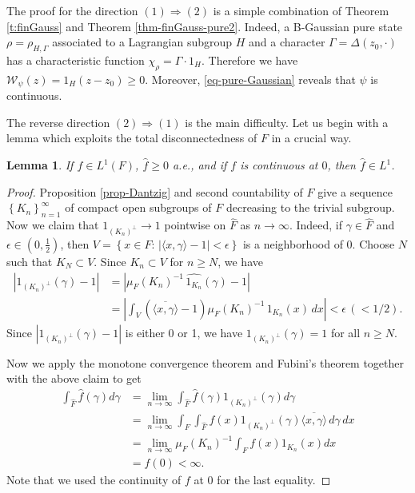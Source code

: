 \documentclass[12pt,reqno]{amsart}
\newtheorem{lem}[thm]{Lemma}
\theoremstyle{definition}
\theoremstyle{definition}
\theoremstyle{definition}
\numberwithin{thm}{section}
\numberwithin{equation}{section}
\newcommand{\set}[1]{\left\{#1\right\}}
\newcommand{\la}{\langle}
\newcommand{\ra}{\rangle}
\newcommand{\W}{\mathcal{W}}
\newcommand{\wh}[1]{\widehat{#1}}
\begin{document}
The proof for the direction $(1)\Rightarrow(2)$ is a simple combination of Theorem \ref{t:finGauss} and Theorem \ref{thm-finGauss-pure2}. Indeed, a B-Gaussian pure state $\rho=\rho_{H,\Gamma}$ associated to a Lagrangian subgroup $H$ and a character $\Gamma=\Delta(z_0,\cdot)$ has a characteristic function $\chi_{\rho}=\Gamma\cdot  1_H$. Therefore we have $\W_{\psi}(z)=1_H(z-z_0)\geq 0$. Moreover, \eqref{eq-pure-Gaussian} reveals that $\psi$ is continuous.

The reverse direction $(2)\Rightarrow(1)$ is the main difficulty. Let us begin with a lemma which exploits the total disconnectedness of $F$ in a crucial way.


\begin{lem} \label{lem-totdisconn-integrable}
If $f\in L^1(F)$, $\hat{f}\geq 0$ a.e., and if $f$ is continuous at $0$, then $\hat{f}\in L^1$.
\end{lem}
\begin{proof}
Proposition \ref{prop-Dantzig} and second countability of $F$ give a sequence $\set{K_n}_{n=1}^{\infty}$ of compact open subgroups of $F$ decreasing to the trivial subgroup. Now we claim that $1_{(K_n)^{\perp}}\to 1$ pointwise on $\wh{F}$ as $n\to \infty$. Indeed, if $\gamma\in \wh{F}$ and $\epsilon\in (0,\frac{1}{2})$, then $V=\set{x\in F:\, |\la x,\gamma\ra-1|<\epsilon}$ is a neighborhood of $0$. Choose $N$ such that $K_N\subset V$. Since $K_n\subset V$ for $n\geq N$, we have
\begin{align*}
    |1_{(K_n)^{\perp}}(\gamma)-1|&=\left|\mu_F(K_n)^{-1}\,\widehat{1_{K_n}}(\gamma)-1\right|\\
    &=\left|\int_V (\overline{\la x,\gamma\ra}-1)\mu_F(K_n)^{-1}\,1_{K_n}(x)\,dx\right|<\epsilon\,(<1/2).
\end{align*}
Since $|1_{(K_n)^{\perp}}(\gamma)-1|$ is either 0 or 1, we have $1_{(K_n)^{\perp}}(\gamma)=1$ for all $n\geq N$.

Now we apply the monotone convergence theorem and Fubini's theorem together with the above claim to get
\begin{align*}
    \int_{\widehat{F}} \hat{f}(\gamma)d\gamma &=\lim_{n\to \infty}\int_{\widehat{F}}\hat{f}(\gamma)1_{(K_n)^{\perp}}(\gamma)d\gamma\\
    &=\lim_{n\to \infty}\int_{F} \int_{\widehat{F}} f(x)1_{(K_n)^{\perp}}(\gamma)\overline{\la x,\gamma\ra}\,d\gamma\,dx\\
    &=\lim_{n\to \infty}\mu_F(K_n)^{-1}\int_{F} f(x){1_{K_n}}(x)dx\\
    &=f(0)<\infty.
\end{align*}
Note that we used the continuity of $f$ at $0$ for the last equality.
\end{proof}
\end{document}
